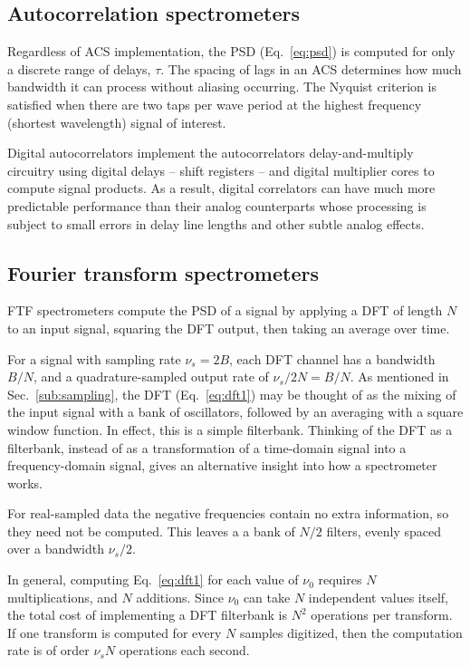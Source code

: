 \documentclass{ws-rv961x669}
\begin{document}
\subsection{Autocorrelation spectrometers}\label{sub:acs}

Regardless of ACS implementation, the PSD (Eq.~\ref{eq:psd}) is computed for only a discrete range of delays, $\tau$. The spacing of lags in an ACS determines how much bandwidth it can process without aliasing occurring. The Nyquist criterion is satisfied when there are two taps per wave period at the highest frequency (shortest wavelength) signal of interest. 


Digital autocorrelators implement the autocorrelators delay-and-multiply circuitry using digital delays -- shift registers -- and digital multiplier cores to compute signal products. As a result, digital correlators can have much more predictable performance than their analog counterparts whose processing is subject to small errors in delay line lengths and other subtle analog effects. 


\subsection{Fourier transform spectrometers}\label{sub:ftf}

FTF spectrometers compute the PSD of a signal by applying a DFT of length $N$ to an input signal, squaring the DFT output, then taking an average over time. 

For a signal with sampling rate $\nu_s=2B$, each DFT channel has a bandwidth $B/N$, and a quadrature-sampled output rate of $\nu_s/2N = B/N$. As mentioned in Sec.~\ref{sub:sampling}, the DFT (Eq.~\ref{eq:dft1}) may be thought of as the mixing of the input signal with a bank of oscillators, followed by an averaging with a square window function. In effect, this is a simple filterbank. Thinking of the DFT as a filterbank, instead of as a transformation of a time-domain signal into a frequency-domain signal, gives an alternative insight into how a spectrometer works.

For real-sampled data the negative frequencies contain no extra information, so they need not be computed. This leaves a a bank of $N/\mbox{2}$ filters, evenly spaced over a bandwidth $\nu_{s}/\mbox{2}$. 

In general, computing Eq.~\ref{eq:dft1} for each value of $\nu_0$ requires $N$ multiplications, and $N$ additions. Since $\nu_0$ can take $N$ independent values itself, the total cost of implementing a DFT filterbank is $N^2$ operations per transform. If one transform is computed for every $N$ samples digitized, then the computation rate is of order $\nu_sN$ operations each second. 
\end{document}
